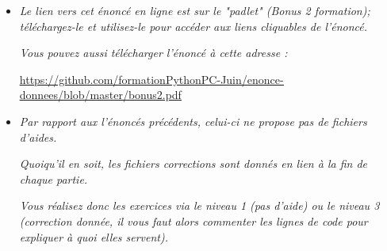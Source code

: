 \documentclass[11pt]{article}
\begin{document}
\begin{itemize}

\item \textit{Le lien vers cet énoncé en ligne est sur le "padlet" (Bonus 2 formation); téléchargez-le et utilisez-le pour accéder aux liens cliquables de l'énoncé.}


\medskip

\textit{Vous pouvez aussi télécharger l'énoncé à cette adresse : }


\begin{center}
\underline{\url{https://github.com/formationPythonPC-Juin/enonce-donnees/blob/master/bonus2.pdf}                                                                                               }
\end{center}







\bigskip










\item \textit{Par rapport aux l'énoncés précédents, celui-ci ne propose pas  de fichiers d'aides.}

\medskip

\textit{Quoiqu'il en soit, les fichiers corrections sont donnés en lien à la fin de chaque partie.}

\medskip
\textit{Vous réalisez donc les exercices via le niveau 1 (pas d'aide) ou le niveau 3 (correction donnée, il vous faut alors commenter les lignes de code pour expliquer à quoi elles servent).} 








\bigskip














\end{itemize}
\end{document}
